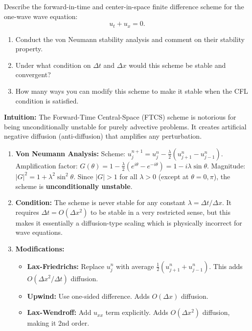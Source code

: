 \begin{exercise}
\label{applied:2012:3}
Describe the forward-in-time and center-in-space finite difference scheme for the one-wave wave equation:
\[
u_{t}+u_{x}=0.
\]
\begin{enumerate}
    \item[(i)] Conduct the von Neumann stability analysis and comment on their stability property.
    \item[(ii)] Under what condition on $\Delta t$ and $\Delta x$ would this scheme be stable and convergent?
    \item[(iii)] How many ways you can modify this scheme to make it stable when the CFL condition is satisfied.
\end{enumerate}
\end{exercise}

\begin{solution}
\textbf{Intuition:} The Forward-Time Central-Space (FTCS) scheme is notorious for being unconditionally unstable for purely advective problems. It creates artificial negative diffusion (anti-diffusion) that amplifies any perturbation.

\begin{enumerate}
\item[(i)] \textbf{Von Neumann Analysis:}
Scheme: $u_j^{n+1} = u_j^n - \frac{\lambda}{2}(u_{j+1}^n - u_{j-1}^n)$.
Amplification factor: $G(\theta) = 1 - \frac{\lambda}{2}(e^{i\theta} - e^{-i\theta}) = 1 - i\lambda \sin\theta$.
Magnitude: $|G|^2 = 1 + \lambda^2 \sin^2\theta$.
Since $|G| > 1$ for all $\lambda > 0$ (except at $\theta = 0, \pi$), the scheme is \textbf{unconditionally unstable}.

\item[(ii)] \textbf{Condition:}
The scheme is never stable for any constant $\lambda = \Delta t/\Delta x$. It requires $\Delta t = O(\Delta x^2)$ to be stable in a very restricted sense, but this makes it essentially a diffusion-type scaling which is physically incorrect for wave equations.

\item[(iii)] \textbf{Modifications:}
\begin{itemize}
    \item \textbf{Lax-Friedrichs:} Replace $u_j^n$ with average $\frac{1}{2}(u_{j+1}^n + u_{j-1}^n)$. This adds $O(\Delta x^2/\Delta t)$ diffusion.
    \item \textbf{Upwind:} Use one-sided difference. Adds $O(\Delta x)$ diffusion.
    \item \textbf{Lax-Wendroff:} Add $u_{xx}$ term explicitly. Adds $O(\Delta x^2)$ diffusion, making it 2nd order.
\end{itemize}
\end{enumerate}
\end{solution}

